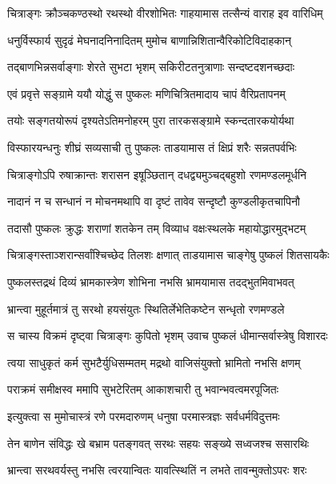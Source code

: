 
\twolineshloka
{चित्राङ्गः क्रौञ्चकण्ठस्थो रथस्थो वीरशोभितः}
{गाहयामास तत्सैन्यं वाराह इव वारिधिम्}%

\twolineshloka
{धनुर्विस्फार्य सुदृढं मेघनादनिनादितम्}
{मुमोच बाणान्निशितान्वैरिकोटिविदाहकान्}%

\twolineshloka
{तद्बाणभिन्नसर्वाङ्गाः शेरते सुभटा भृशम्}
{सकिरीटतनुत्राणाः सन्दष्टदशनच्छदाः}%

\twolineshloka
{एवं प्रवृत्ते सङ्ग्रामे ययौ योद्धुं स पुष्कलः}
{मणिचित्रितमादाय चापं वैरिप्रतापनम्}%

\twolineshloka
{तयोः सङ्गतयोरूपं दृश्यतेऽतिमनोहरम्}
{पुरा तारकसङ्ग्रामे स्कन्दतारकयोर्यथा}%

\twolineshloka
{विस्फारयन्धनुः शीघ्रं सव्यसाची तु पुष्कलः}
{ताडयामास तं क्षिप्रं शरैः सन्नतपर्वभिः}%

\twolineshloka
{चित्राङ्गोऽपि रुषाक्रान्तः शरासन इषूञ्छितान्}
{दधद्व्यमुञ्चद्बहुशो रणमण्डलमूर्धनि}%

\twolineshloka
{नादानं न च सन्धानं न मोचनमथापि वा}
{दृष्टं तावेव सन्दृष्टौ कुण्डलीकृतचापिनौ}%

\twolineshloka
{तदासौ पुष्कलः क्रुद्धः शराणां शतकेन तम्}
{विव्याध वक्षःस्थलके महायोद्धारमुद्भटम्}%

\twolineshloka
{चित्राङ्गस्ताञ्शरान्सर्वांश्चिच्छेद तिलशः क्षणात्}
{ताडयामास चाङ्गेषु पुष्कलं शितसायकैः}%

\twolineshloka
{पुष्कलस्तद्रथं दिव्यं भ्रामकास्त्रेण शोभिना}
{नभसि भ्रामयामास तदद्भुतमिवाभवत्}%

\twolineshloka
{भ्रान्त्वा मुहूर्तमात्रं तु सरथो हयसंयुतः}
{स्थितिर्लेभेतिकष्टेन सन्धृतो रणमण्डले}%

\twolineshloka
{स चास्य विक्रमं दृष्ट्वा चित्राङ्गः कुपितो भृशम्}
{उवाच पुष्कलं धीमान्सर्वास्त्रेषु विशारदः}%


\twolineshloka
{त्वया साधुकृतं कर्म सुभटैर्युधिसम्मतम्}
{मद्रथो वाजिसंयुक्तो भ्रामितो नभसि क्षणम्}%

\twolineshloka
{पराक्रमं समीक्षस्व ममापि सुभटेरितम्}
{आकाशचारी तु भवान्भवत्वमरपूजितः}%

\twolineshloka
{इत्युक्त्वा स मुमोचास्त्रं रणे परमदारुणम्}
{धनुषा परमास्त्रज्ञः सर्वधर्मविदुत्तमः}%

\twolineshloka
{तेन बाणेन संविद्धः खे बभ्राम पतङ्गवत्}
{सरथः सहयः सङ्ख्ये सध्वजश्च ससारथिः}%

\twolineshloka
{भ्रान्त्वा सरथवर्यस्तु नभसि त्वरयान्वितः}
{यावत्स्थितिं न लभते तावन्मुक्तोऽपरः शरः}%

